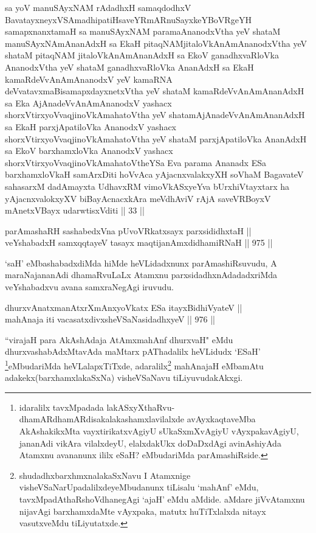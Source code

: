 \begin{kandikeshl}
sa yoV manuSAyxNAM rAdadhxH samaqdodhxV BavatayxneyxVSAmadhipatiH\break saveYRmARnuSayxkeYBoVRgeYH samapxnanxtamaH sa manuSAyxNAM parama\break AnanodxV\s tha yeV shataM manuSAyxNAmAnanAdxH sa EkaH pitaqNAM\break jitaloVkAnAmAnanodxV\s tha yeV shataM pitaqNAM jitaloVkAnAmAnanAdxH sa EkoV ganadhxvaRloVka AnanodxV\s tha yeV shataM ganadhxvaRloVka AnanAdxH sa EkaH kamaRdeVvAnAmAnanodxV yeV kamaRNA deVvatavxmaBisamapxdayxnetxV\s tha yeV shataM kamaRdeVvAnAmAnanAdxH sa Eka AjAnadeVvAnAmAnanodxV yashacx shorxVtirxyoV\s vaqjinoV\s kAmahatoV\s tha yeV shatamAjAnadeVvAnAmAnanAdxH sa EkaH parxjApatiloVka AnanodxV yashacx shorxVtirxyoV\s vaqjinoV\s kAmahatoV\s tha yeV shataM parxjApatiloVka AnanAdxH sa EkoV barxhamxloVka AnanodxV yashacx shorxVtirxyoV\s vaqjinoV\s kAmahatoV\s theYSa Eva parama Ananadx ESa barxhamxloVkaH samArxDiti hoVvAca yAjacnxvalakxyXH soVhaM BagavateV sahasarxM dadAmayxta UdhavxRM vimoVkASxyeYva bUrxhiVtayxtarx ha yAjacnxvalokxyXV biBayAcnacxkAra meVdhAviV rAjA saveVRBoyxV mAnetxVBayx udarwtisxVditi || 33 ||
\end{kandikeshl}


\begin{shl}
parAmashaRH sashabedxVna pUvoVRkatxsayx parxsididhxtaH || \\
veYshabadxH samxqqtayeV tasayx maqtijanAmxdidhamiRNaH \hfill || 975 ||  
\end{shl}

\begin{artha}
`saH' eMbashabadxdiMda hiMde heVLidadxnunx parAmashiRsuvudu, A maraNajananAdi dhamaRvuLaLx Atamxnu parxsidadhxnAdadadxriMda veYshabadxvu avana samxraNegAgi iruvudu.
\end{artha}


\begin{shl}
dhurxvAnatxmanAtxrXmAnxyoVkatx ESa itayxBidhiVyateV || \\
mahAnaja iti vacasatxdivxsheVSaNasidadhxyeV \hfill || 976 ||  
\end{shl}

\begin{artha}
``virajaH para AkAshAdaja AtAmxmahAnf dhurxvaH" eMdu dhurxvashabAdxMtavAda maMtarx pAThadalilx heVLidudx `ESaH' \footnote{idaralilx tavxMpadada lakASxyXthaRvu-dhamARdhamARdisakalakashamxlavilalxde avAyxkaqtaveMba AkAshakikxMta vayxtirikatxvAgiyU sUkaSxmXvAgiyU vAyxpakavAgiyU, jananAdi vikAra vilalxdeyU, elalxdakUkx doDaDxdAgi avinAshiyAda Atamxnu avananunx ililx eSaH? eMbudariMda parAmashiRside.}eMbudariMda heVLalapxTiTxde, adaralilx\footnote{shudadhxbarxhmxnalakaSxNavu I Atamxnige visheVSaNarUpadalilxdeyeMbudanunx tiLisalu `mahAnf' eMdu, tavxMpadAthaRshoVdhanegAgi `ajaH' eMdu aMdide. aMdare jiVvAtamxnu nijavAgi barxhamxdaMte vAyxpaka, matutx huTiTxlalxda nitayx vasutxveMdu tiLiyutatxde.} mahAnajaH eMbamAtu adakekx(barxhamxlakaSxNa) visheVSaNavu tiLiyuvudakAkxgi.
\end{artha}

